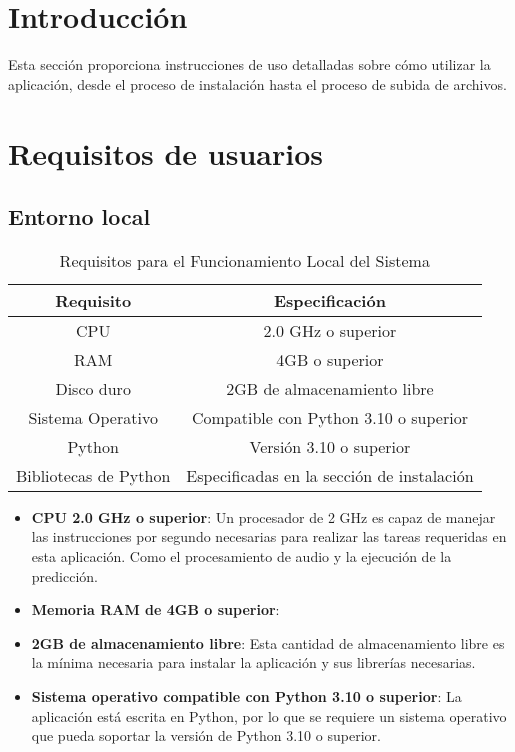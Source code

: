 
\section{Introducción}

Esta sección proporciona instrucciones de uso detalladas sobre cómo utilizar la aplicación, desde el proceso de instalación hasta el proceso de subida de archivos.

\section{Requisitos de usuarios}

\subsection{Entorno local}

\begin{table}[h]
	\centering
	\begin{tabular}{|c|c|}
		\hline
		\textbf{Requisito} & \textbf{Especificación}\\
		\hline
		CPU & 2.0 GHz o superior\\
		\hline
		RAM & 4GB o superior\\
		\hline
		Disco duro & 2GB de almacenamiento libre\\
		\hline
		Sistema Operativo & Compatible con Python 3.10 o superior\\
		\hline
		Python & Versión 3.10 o superior\\
		\hline
		Bibliotecas de Python & Especificadas en la sección de instalación\\
		\hline
	\end{tabular}
	\caption{Requisitos para el Funcionamiento Local del Sistema}
\end{table}

\begin{itemize}
\tightlist

\item \textbf{CPU 2.0 GHz o superior}: Un procesador de 2 GHz es capaz de manejar las instrucciones por segundo necesarias para realizar las tareas requeridas en esta aplicación. Como el procesamiento de audio y la ejecución de la predicción.

\item \textbf{Memoria RAM de 4GB o superior}: 

\item \textbf{2GB de almacenamiento libre}: Esta cantidad de almacenamiento libre es la mínima necesaria para instalar la aplicación y sus librerías necesarias.

\item \textbf{Sistema operativo compatible con Python 3.10 o superior}: La aplicación está escrita en Python, por lo que se requiere un sistema operativo que pueda soportar la versión de Python 3.10 o superior.

\end{itemize}

